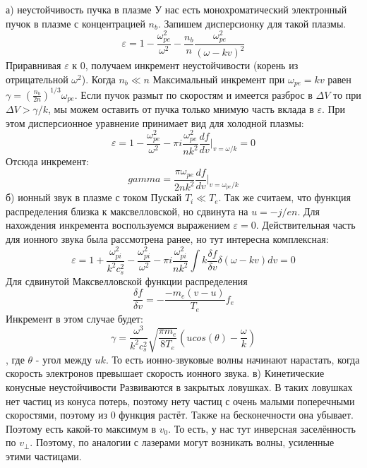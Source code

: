 \documentclass[10pt, a4paper]{article}
\begin{document}
а) неустойчивость пучка в плазме
У нас есть монохроматический электронный пучок в плазме с концентрацией $n_b$. Запишем дисперсионку для такой плазмы.
\begin{equation}
\varepsilon = 1-\frac{\omega^2_{pe}}{\omega^2}-\frac{n_b}{n} \frac{\omega^2_{pe}}{(\omega - kv)^2}
\end{equation}
Приравнивая $\varepsilon$ к 0, получаем инкремент неустойчивости (корень из отрицательной $\omega^2$). Когда $n_b \ll n$ Максимальный инкремент при $\omega_{pe}=kv$ равен $\gamma=(\frac{n_b}{2n})^{1/3}\omega_{pe}$.
Если пучок размыт по скоростям и имеется разброс в $\Delta V$ то при $\Delta V > \gamma/k$, мы можем оставить от пучка только мнимую часть вклада в $\varepsilon$. При этом дисперсионное уравнение принимает вид для холодной плазмы:
\begin{equation}
\varepsilon=1 - \frac{\omega^2_{pe}}{\omega^2} - \pi i \frac{\omega^2_{pe}}{n k^2} \frac{df}{dv}|_{v=\omega/k}=0
\end{equation}
Отсюда инкремент:
\begin{equation}
	 gamma=\frac{\pi\omega_{pe}}{2nk^2} \frac{df}{dv} |_{v=\omega_{pe}/k}
\end{equation}
б) ионный звук в плазме с током
Пускай $T_i \ll T_e$. Так же считаем, что функция распределения близка к максвелловской, но сдвинута на $u=-j/en$. Для нахождения инкремента воспользуемся выражением $\varepsilon=0$. Действительная часть для ионного звука была рассмотрена ранее, но тут интересна комплексная:
\begin{equation}
\varepsilon = 1 + \frac{\omega^2_{pi}}{k^2 c^2_s} - \frac{\omega^2_{pi}}{\omega^2} - \pi i \frac{\omega^2_{pi}}{nk^2} \int k \frac{\delta f}{\delta v} \delta (\omega - kv) dv =0
\end{equation}
Для сдвинутой Максвелловской функции распределения
\begin{equation}
\frac{\delta f}{\delta v} = - \frac{-m_e (v-u)}{T_e} f_e
\end{equation}
Инкремент в этом случае будет:
\begin{equation}
\gamma=\frac{\omega^3}{k^2 c^2_s} \sqrt{\frac{\pi m_e}{8T_e}} (u cos(\theta)- \frac{\omega}{k})
\end{equation}
, где $\theta$ - угол между $u k$. То есть ионно-звуковые волны начинают нарастать, когда скорость электронов превышает скорость ионного звука.
в) Кинетические конусные неустойчивости
Развиваются в закрытых ловушках. В таких ловушках нет частиц из конуса потерь, поэтому нету частиц с очень малыми поперечными скоростями, поэтому из 0 функция растёт. Также на бесконечности она убывает. Поэтому есть какой-то максимум в $v_0$. То есть, у нас тут инверсная заселённость по $v_{\perp}$. Поэтому, по аналогии с лазерами могут возникать волны, усиленные этими частицами.
\end{document}

